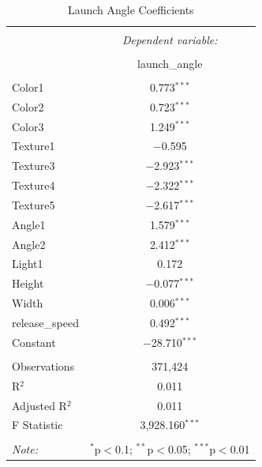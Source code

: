\documentclass{article}
\begin{document}
\\
\begin{table}[!htbp] \centering 
  \caption{Launch Angle Coefficients} 
  \label{} 
\begin{tabular}{@{\extracolsep{5pt}}lc} 
\\[-1.8ex]\hline 
\hline \\[-1.8ex] 
 & \multicolumn{1}{c}{\textit{Dependent variable:}} \\ 
\cline{2-2} 
\\[-1.8ex] & launch\_angle \\ 
\hline \\[-1.8ex] 
 Color1 & 0.773$^{***}$ \\ 
 Color2 & 0.723$^{***}$ \\ 
 Color3 & 1.249$^{***}$ \\ 
 Texture1 & $-$0.595 \\ 
 Texture3 & $-$2.923$^{***}$ \\ 
 Texture4 & $-$2.322$^{***}$ \\ 
 Texture5 & $-$2.617$^{***}$ \\ 
 Angle1 & 1.579$^{***}$ \\ 
 Angle2 & 2.412$^{***}$ \\ 
 Light1 & 0.172 \\ 
 Height & $-$0.077$^{***}$ \\ 
 Width & 0.006$^{***}$ \\ 
 release\_speed & 0.492$^{***}$ \\ 
 Constant & $-$28.710$^{***}$ \\ 
\hline \\[-1.8ex] 
Observations & 371,424 \\ 
R$^{2}$ & 0.011 \\ 
Adjusted R$^{2}$ & 0.011 \\ 
F Statistic & 3,928.160$^{***}$ \\ 
\hline 
\hline \\[-1.8ex] 
\textit{Note:}  & \multicolumn{1}{r}{$^{*}$p$<$0.1; $^{**}$p$<$0.05; $^{***}$p$<$0.01} \\ 
\end{tabular} 
\end{table}
\end{document}
